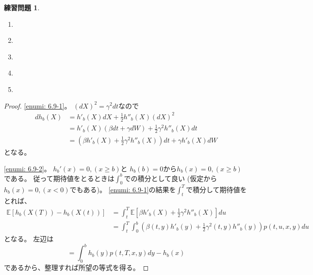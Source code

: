 \documentclass[uplatex]{jsarticle}
\theoremstyle{definition}
\newtheorem{prob}[prob]{練習問題}
\def\E{\mathbb{E}}
\begin{document}
\begin{prob}\label{prob: 6.9}
  \begin{enumerate}
    \item \label{enumi: 6.9-1}
    \item \label{enumi: 6.9-2}
    \item \label{enumi: 6.9-3}
    \item \label{enumi: 6.9-4}
    \item \label{enumi: 6.9-5}
  \end{enumerate}
\end{prob}

\begin{proof}
  \ref{enumi: 6.9-1}。
  \((dX)^2 = \gamma^2dt\)なので
  \begin{align*}
    dh_b(X) &= h'_b(X)dX + \frac{1}{2}h''_b(X)(dX)^2 \\
    &= h'_b(X)\left( \beta dt + \gamma dW\right)
    + \frac{1}{2}\gamma^2 h''_b(X)dt \\
    &= \left( \beta h'_b(X) + \frac{1}{2}\gamma^2 h''_b(X) \right) dt
    + \gamma h'_b(X)dW
  \end{align*}
  となる。

  \ref{enumi: 6.9-2}。
  \(h_b'(x) = 0 , (x \geq b)\)と
  \(h_b(b) = 0\)から\(h_b(x) = 0 , (x \geq b)\)である。
  従って期待値をとるときは\(\int_0^b\)での積分として良い
  (仮定から\(h_b(x)=0 , (x<0)\)でもある)。
  \ref{enumi: 6.9-1}の結果を\(\int_t^T\)で積分して期待値をとれば、
  \begin{align*}
    \E \left[ h_b(X(T)) - h_b(X(t))\right]　
    &= \int_t^T \E \left[ \beta h'_b(X)
    + \frac{1}{2}\gamma^2 h''_b(X)\right] du \\
    &= \int_t^T \int_0^b \left( \beta (t,y) h'_b(y)
    + \frac{1}{2}\gamma^2(t,y) h''_b(y)\right) p(t,u,x,y) du
  \end{align*}
  となる。
  左辺は
  \[
  = \int_0^b h_b(y)p(t,T,x,y)dy - h_b(x)
  \]
  であるから、整理すれば所望の等式を得る。


\end{proof}
\end{document}
